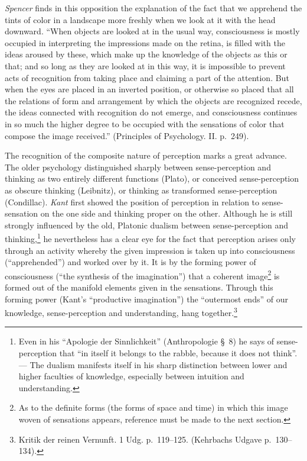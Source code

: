 \documentclass[12pt,a4paper]{book}
\newcommand{\opage}[1]{\marginnote{\footnotesize\textit{[#1]}}}
\begin{document}
\emph{Spencer} finds in this opposition the explanation of the fact that
we apprehend the tints of color in a landscape more freshly when we look
at it with the head downward. ``When objects are looked at in the usual
way, consciousness is mostly occupied in interpreting the impressions made
on the retina, is filled with the ideas aroused by these, which make up
the knowledge of the objects as this or that; and so long as they are
looked at in this way, it is impossible to prevent acts of recognition
from taking place and claiming a part of the attention. But when the eyes
are placed in an inverted position, or otherwise so placed that all the
relations of form and arrangement by which the objects are recognized
recede, the ideas connected with recognition do not emerge, and
consciousness continues in so much the higher degree to be occupied with
the sensations of color that compose the image received.'' (Principles of
Psychology. II. p.~249).

The recognition of the composite nature of perception marks a great
advance. The older psychology distinguished sharply between
sense-perception and thinking as two entirely different functions (Plato),
or conceived sense-perception as obscure thinking (Leibnitz), or thinking
as transformed sense-perception (Condillac). \emph{Kant} first showed the
position of perception in relation to sense-sensation on the one side and
thinking proper on the other. Although he is still strongly influenced by
\opage{159}the old, Platonic dualism between sense-perception and
thinking,\footnote{Even in his ``Apologie der Sinnlichkeit''
(Anthropologie \S~8) he says of sense-perception that ``in itself it
belongs to the rabble, because it does not think''. --- The dualism
manifests itself in his sharp distinction between lower and higher
faculties of knowledge, especially between intuition and understanding.}
he nevertheless has a clear eye for the fact that perception arises only
through an activity whereby the given impression is taken up into
consciousness (``apprehended'') and worked over by it. It is by the
forming power of consciousness (``the synthesis of the imagination'') that
a coherent image\footnote{As to the definite forms (the forms of space and
time) in which this image woven of sensations appears, reference must be
made to the next section.} is formed out of the manifold elements given in
the sensations. Through this forming power (Kant's ``productive
imagination'') the ``outermost ends'' of our knowledge, sense-perception
and
understanding, hang together.\footnote{Kritik der reinen Vernunft. 1 Udg.
p.~119--125. (Kehrbachs Udgave p.~130--134).}
\end{document}
